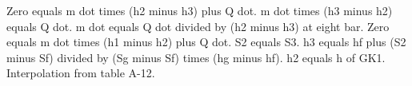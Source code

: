 Zero equals m dot times (h2 minus h3) plus Q dot. m dot times (h3 minus h2) equals Q dot. m dot equals Q dot divided by (h2 minus h3) at eight bar. Zero equals m dot times (h1 minus h2) plus Q dot. S2 equals S3. h3 equals hf plus (S2 minus Sf) divided by (Sg minus Sf) times (hg minus hf). h2 equals h of GK1. Interpolation from table A-12.